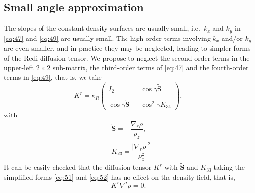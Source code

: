 \documentclass[12pt]{report}
\def\tilde{\widetilde}
\def\bs{\boldsymbol}
\def\Sb{\bs{\mathrm{S}}}
\begin{document}
\subsection{Small angle approximation}
The slopes of the constant density surfaces are usually small,
i.e.~$k_x$ and $k_y$ in \eqref{eq:47} and \eqref{eq:49} are usually
small.  The high order terms involving $k_x$ and/or $k_y$ are even
smaller, and in practice they may be neglected, leading to simpler forms
of the Redi diffusion tensor. We propose to neglect the second-order
terms in the upper-left $2\times 2$ sub-matrix, the third-order
terms of \eqref{eq:47} and the fourth-order terms in \eqref{eq:49},
that is, we take
\begin{equation}
  \label{eq:53}
  K^r = \kappa_R \left(\begin{matrix}
  I_2 & { } & \cos\gamma\tilde{\Sb}\\
\\
  \cos\gamma\tilde{\mathbf{S}} & { } & \cos^2\gamma K_{33}\end{matrix}\right), 
\end{equation}
with
\begin{align}
  &\tilde{\mathbf{S}} =
  -\dfrac{\nabla_r\rho}{\rho_z}, \label{eq:51}\\ 
   &K_{33} = \dfrac{|\nabla_r\rho|^2}{\rho_z^2}\label{eq:52}
 \end{align}
It can be easily checked that the diffusion tensor $K^r$ with
$\tilde{\mathbf{S}}$ and $K_{33}$ taking the simplified forms \eqref{eq:51}
and \eqref{eq:52} has no effect on the density field, that is,
\begin{displaymath}
  K^r\nabla^r\rho = 0.
\end{displaymath}
\end{document}
